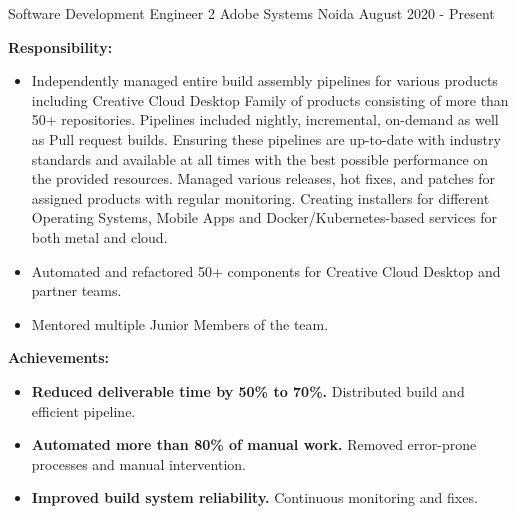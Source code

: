 

\begin{cventries}
\vspace{-1mm}

\cventry
    {Software Development Engineer 2} %
    {Adobe Systems} %
    {Noida} %
    {August 2020 - Present} %
    {
        \vspace{-4mm}
        \item \textbf{Responsibility:} 
        \begin{itemize}
            \item Independently managed entire build assembly pipelines for various products including Creative Cloud Desktop Family of products consisting of more than 50+ repositories. Pipelines included nightly, incremental, on-demand as well as Pull request builds. Ensuring these pipelines are up-to-date with industry standards and available at all times with the best possible performance on the provided resources. Managed various releases, hot fixes, and patches for assigned products with regular monitoring. Creating installers for different Operating Systems, Mobile Apps and Docker/Kubernetes-based services for both metal and cloud.
            \item Automated and refactored 50+ components for Creative Cloud Desktop and partner teams.
            \item Mentored multiple Junior Members of the team.
        \end{itemize}
        \item \textbf{Achievements:}
        \begin{itemize}
            \item \textbf{Reduced deliverable time by 50\% to 70\%.} Distributed build and efficient pipeline.
            \item \textbf{Automated more than 80\% of manual work.} Removed error-prone processes and manual intervention.
            \item \textbf{Improved build system reliability.} Continuous monitoring and fixes.
        \end{itemize}
}
\end{cventries}
